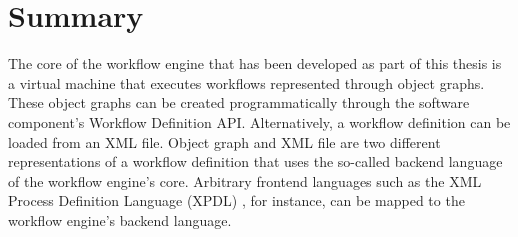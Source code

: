 \clearpage
\section{Summary}

The core of the workflow engine that has been developed as part of this thesis
is a virtual machine that executes workflows represented through object graphs.
These object graphs can be created programmatically through the software
component's Workflow Definition API. Alternatively, a workflow definition can
be loaded from an XML file. Object graph and XML file are two different
representations of a workflow definition that uses the so-called backend
language of the workflow engine's core. Arbitrary frontend languages such as
the XML Process Definition Language (XPDL) \cite{WfMC05}, for instance, can be
mapped to the workflow engine's backend language.
